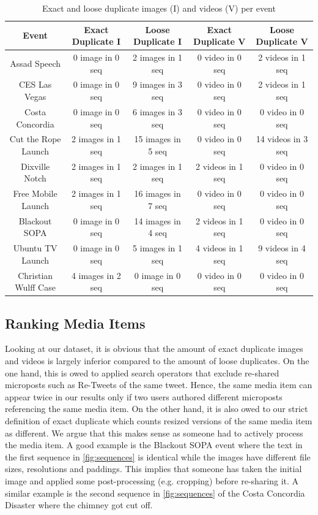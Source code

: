 \begin{table}[htbp]
  \begin{tabular}{|c|c|c||c|c|}
    \hline
    \textbf{Event} & \textbf{Exact Duplicate I} & \textbf{Loose Duplicate I} & \textbf{Exact Duplicate V} & \textbf{Loose Duplicate V}\\
    \hline
    Assad Speech & 0 image in 0 seq & 2 images in 1 seq & 0 video in 0 seq & 2 videos in 1 seq\\
    CES Las Vegas & 0 image in 0 seq & 9 images in 3 seq & 0 video in 0 seq & 2 videos in 1 seq\\
    Costa Concordia & 0 image in 0 seq & 6 images in 3 seq & 0 video in 0 seq & 0 video in 0 seq\\
    Cut the Rope Launch & 2 images in 1 seq & 15 images in 5 seq & 0 video in 0 seq & 14 videos in 3 seq\\
    Dixville Notch & 2 images in 1 seq & 2 images in 1 seq & 2 videos in 1 seq & 0 video in 0 seq\\
    Free Mobile Launch & 2 images in 1 seq & 16 images in 7 seq & 0 video in 0 seq & 0 video in 0 seq\\
    Blackout SOPA & 0 image in 0 seq & 14 images in 4 seq & 2 videos in 1 seq & 0 video in 0 seq\\
    Ubuntu TV Launch & 0 image in 0 seq & 5 images in 1 seq & 4 videos in 1 seq & 9 videos in 4 seq\\
    Christian Wulff Case & 4 images in 2 seq & 0 image in 0 seq & 0 video in 0 seq & 0 video in 0 seq\\
    \hline
  \end{tabular}
  \label{tab:duplicate-media}
  \caption{Exact and loose duplicate images (I) and videos (V) per event}
\end{table}

\subsection{Ranking Media Items}
Looking at our dataset, it is obvious that the amount of exact duplicate images and videos is largely inferior compared to the amount of loose duplicates. On the one hand, this is owed to applied search operators that exclude re-shared microposts such as Re-Tweets of the same tweet. Hence, the same media item can appear twice in our results only if two users authored different microposts referencing the same media item. On the other hand, it is also owed to our strict definition of exact duplicate which counts resized versions of the same media item as different. We argue that this makes sense as someone had to actively process the media item. A good example is the Blackout SOPA event where the text in the first sequence in \autoref{fig:sequences} is identical while the images have different file sizes, resolutions and paddings. This implies that someone has taken the initial image and applied some post-processing (e.g. cropping) before re-sharing it. A similar example is the second sequence in \autoref{fig:sequences} of the Costa Concordia Disaster where the chimney got cut off.

